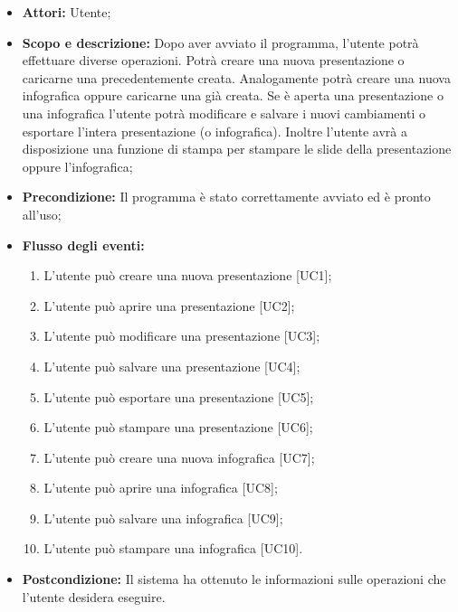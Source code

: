 \begin{itemize}
	\item \textbf{Attori:} Utente;
	\item \textbf{Scopo e descrizione:} Dopo aver avviato il programma, l'utente potrà effettuare diverse operazioni. Potrà creare una nuova presentazione o caricarne una precedentemente creata. Analogamente potrà creare una nuova \gls{infografica} oppure caricarne una già creata. Se è aperta una presentazione o una \gls{infografica} l'utente potrà modificare e salvare i nuovi cambiamenti o esportare l'intera presentazione (o \gls{infografica}). Inoltre l'utente avrà a disposizione una funzione di stampa per stampare le slide della presentazione oppure l'\gls{infografica};
	\item \textbf{Precondizione:} Il programma è stato correttamente avviato ed è pronto all'uso;
	\item \textbf{Flusso degli eventi:}
	\begin{enumerate}
		\item L'utente può creare una nuova presentazione [UC1];
		\item L'utente può aprire una presentazione [UC2];
		\item L'utente può modificare una presentazione [UC3];
		\item L'utente può salvare una presentazione [UC4];
		\item L'utente può esportare una presentazione [UC5];
		\item L'utente può stampare una presentazione [UC6];
		\item L'utente può creare una nuova \gls{infografica} [UC7];
		\item L'utente può aprire una \gls{infografica} [UC8];
		\item L'utente può salvare una \gls{infografica} [UC9];
		\item L'utente può stampare una \gls{infografica} [UC10].
	\end{enumerate}
	\item \textbf{Postcondizione:} Il sistema ha ottenuto le informazioni sulle operazioni che l’utente desidera eseguire.
\end{itemize}




















